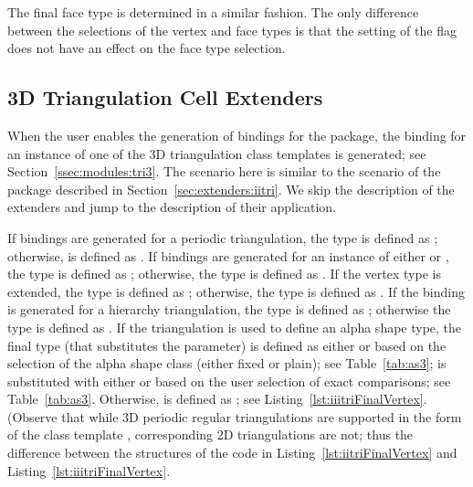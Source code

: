 The final face type is determined in a similar fashion. The only
difference between the selections of the vertex and face types is that
the setting of the \cmake{} flag  does
not have an effect on the face type selection.

\subsection{3D Triangulation Cell Extenders}
\label{sec:extenders:iiitri}
When the user enables the generation of bindings for the 
\iiiDTriangulationsPackage{} package, the binding for an instance 
of one of the 3D triangulation class templates is generated; see 
Section~\ref{ssec:modules:tri3}. The scenario here is similar to
the scenario of the \iiDTriangulationsPackage{} package described
in Section~\ref{sec:extenders:iitri}. We skip the description of
the extenders and jump to the description of their application.

If bindings are generated for a periodic triangulation, the type
 is defined as
;
otherwise,  is defined as
.
%
If bindings are generated for an instance of either
 or
,
the type  is defined as
;
otherwise, the type  is defined as
.
%
If the vertex type is extended, the type  is defined 
as 
;
otherwise, the type  is defined as .
%
If the binding is generated for a hierarchy triangulation, the type 
 is defined as
; otherwise
the type  is defined as .
%
If the triangulation is used to define an alpha shape type,
the final type  (that substitutes the
 parameter) is defined as either
or
based on the selection of the alpha shape class (either fixed or plain); 
see Table~\ref{tab:as3};  is substituted with 
either  or  based on the user 
selection of exact comparisons; see Table~\ref{tab:as3}. Otherwise, 
 is defined as ; see 
Listing~\ref{lst:iiitriFinalVertex}. (Observe that while 3D periodic 
regular triangulations are supported in the form of the class template 
,
corresponding 2D triangulations are not; thus the difference between
the structures of the code in Listing~\ref{lst:iitriFinalVertex} and Listing~\ref{lst:iiitriFinalVertex}.


